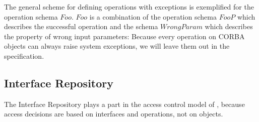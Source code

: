 The general scheme for defining operations with exceptions is exemplified for
the operation schema $Foo$.  $Foo$ is a combination of the operation schema
$FooP$ which describes the successful operation and the schema $WrongParam$
which describes the property of wrong input parameters: 
Because every operation on CORBA objects can always raise system exceptions, we
will leave them out in the specification.


\subsection{Interface Repository} \label{sec:InterfaceRepository}

\vspace{2ex}

The Interface Repository plays a part in the access control model of \corbasec ,
because access decisions are based on interfaces and operations, not on objects.

